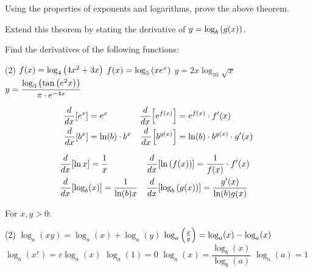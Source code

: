 \documentclass[../mathNotesPreamble]{subfiles}
\begin{document}
  \begin{ex*}
    Using the properties of exponents and logarithms, prove the above theorem. 
    
    \noindent
    Extend this theorem by stating the derivative of $y=\log_b\parens{g(x)}$.
  \end{ex*}
  \vfill
  \begin{ex*}
    Find the derivatives of the following functions:
  \end{ex*}
  \begin{tasks}[after-item-skip=\stretch{1}, label=~](2)
    \task $f(x)=\log_4\parens{4x^2+3x}$
    \task $f(x)=\log_5\parens{x e^x}$
    \task $y=2x\log_{10}\sqrt x$
    \task $y=\dfrac{\log_3\parens{\tan\parens{e^2x}}}{\pi\cdot e\inv[4x]}$
  \end{tasks}
  \vfill
  \pagebreak
  
  \setlength{\jot}{10pt}
  \begin{thmBox*}
    \begin{align*}
      \hspace*{-10pt}
      \ddx \sbrkt{e^x}&=e^x&  \ddx \sbrkt{e^{f(x)}}&=e^{f(x)}\cdot f'(x)\\
      \hspace*{-10pt}
      \ddx \sbrkt{b^x}&=\ln(b)\cdot b^x&  \ddx \sbrkt{b^{g(x)}}&=\ln(b)\cdot b^{g(x)}\cdot g'(x)\hspace*{-10pt}
    \end{align*}
  \end{thmBox*}

  \begin{thmBox*}
    \begin{align*}
      \hspace*{-10pt}
      &\ddx\sbrkt{\ln x}=\frac{1}{x}& &\ddx\sbrkt{\ln\parens{f(x)}}=\frac{1}{f(x)}\cdot f'(x)\hspace*{-10pt}\\
      \hspace*{-10pt}
      &\ddx\sbrkt{\log_b(x)}=\frac{1}{\ln(b) x}& &\ddx\sbrkt{\log_b\parens{g(x)}}=\frac{g'(x)}{\ln(b) g(x)}
    \end{align*} 
  \end{thmBox*}

   \begin{thmBox*}
    For $x,y>0$:
      \begin{tasks}[after-item-skip=10pt, label=~](2)
        \task $\log_a(xy)=\log_a(x)+\log_a(y)$
        \task $\log_a\parens{\frac{x}{y}}=\log_a(x)-\log_a(x)$
        \task $\log_a(x^r)=r\log_a(x)$
        \task $\log_a(1)=0$
        \task $\log_a(x)=\dfrac{\log_b(x)}{\log_b(a)}$
        \task $\log_a(a)=1$
      \end{tasks}
   \end{thmBox*}
    \pagebreak
  
\end{document}
